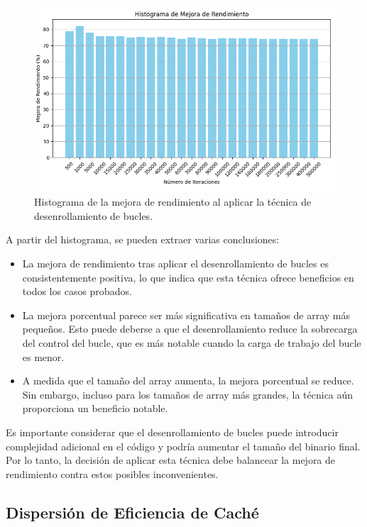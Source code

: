 \documentclass[a4paper,twocolumn]{article}
\begin{document}
\begin{figure}[H]
    \centering
    \includegraphics[width=\columnwidth]{img/improvement.png}
    \caption{Histograma de la mejora de rendimiento al aplicar la técnica de desenrollamiento de bucles.}
    \label{fig:histograma_mejora_rendimiento}
\end{figure}


A partir del histograma, se pueden extraer varias conclusiones:

\begin{itemize}
    \item La mejora de rendimiento tras aplicar el desenrollamiento de bucles es consistentemente positiva, lo que indica que esta técnica ofrece beneficios en todos los casos probados.
    \item La mejora porcentual parece ser más significativa en tamaños de array más pequeños. Esto puede deberse a que el desenrollamiento reduce la sobrecarga del control del bucle, que es más notable cuando la carga de trabajo del bucle es menor.
    \item A medida que el tamaño del array aumenta, la mejora porcentual se reduce. Sin embargo, incluso para los tamaños de array más grandes, la técnica aún proporciona un beneficio notable.
\end{itemize}

Es importante considerar que el desenrollamiento de bucles puede introducir complejidad adicional en el código y podría aumentar el tamaño del binario final. Por lo tanto, la decisión de aplicar esta técnica debe balancear la mejora de rendimiento contra estos posibles inconvenientes.

\subsection{Dispersión de Eficiencia de Caché}
\end{document}
